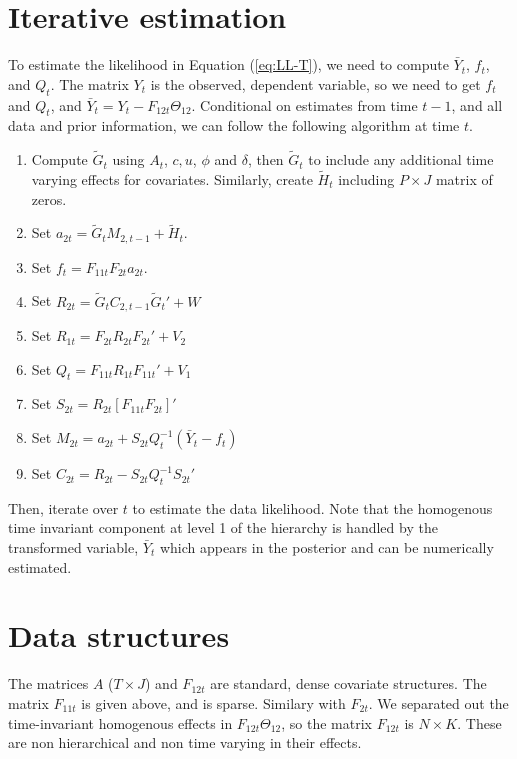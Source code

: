 \documentclass[letter,10pt]{article}
\begin{document}
\section*{Iterative estimation}

To estimate the likelihood in Equation (\ref{eq:LL-T}), we need to
compute $\bar{Y}_t$, $f_t$, and $Q_t$.  The matrix $Y_t$ is the observed,
dependent variable, so we need to get $f_t$ and $Q_t$, and $\bar{Y}_t = Y_t - F_{12t} \Theta_{12}$.  
Conditional on estimates from time $t-1$, and all data and prior information, we can
follow the following algorithm at time $t$.  

\begin{enumerate}
\item Compute $\tilde{G}_t$ using $A_t$, $c, u$, $\phi$ and $\delta$, then $\tilde{G}_t$ to include any 
additional time varying effects for covariates. 
Similarly, create $\tilde{H}_t$ including $P\times J$ matrix of zeros.  
\item Set $a_{2t}=\tilde{G}_tM_{2,t-1}+\tilde{H}_t$.
\item Set $f_t=F_{11t}F_{2t}a_{2t}$.
\item Set $R_{2t}=\tilde{G}_tC_{2,t-1}\tilde{G}_t'+W$
\item Set $R_{1t}=F_{2t}R_{2t}F_{2t}'+V_2$
\item Set $Q_t=F_{11t}R_{1t}F_{11t}'+V_1$
\item Set $S_{2t}=R_{2t}\left[F_{11t}F_{2t}\right]'$
\item Set $M_{2t}=a_{2t}+S_{2t}Q_t^{-1}(\bar{Y}_t-f_t)$
\item Set $C_{2t}=R_{2t}-S_{2t}Q_t^{-1}S_{2t}'$
\end{enumerate}
Then, iterate over $t$ to estimate the data likelihood.  Note that the homogenous time invariant component 
at level 1 of the hierarchy is handled by the transformed variable, $\bar{Y}_t$ which appears in the posterior and can 
be numerically estimated.    

\section*{Data structures}

The matrices $A$ ($T\times J$) and $F_{12t}$  are standard, dense covariate structures.  
The matrix $F_{11t}$ is given above, and is sparse.  Similary with $F_{2t}$.  
We separated out the time-invariant homogenous effects in $F_{12t}\Theta_{12}$, so 
the matrix $F_{12t}$ is $N\times K$.  These are non hierarchical and non time varying in their effects.   
\end{document}
